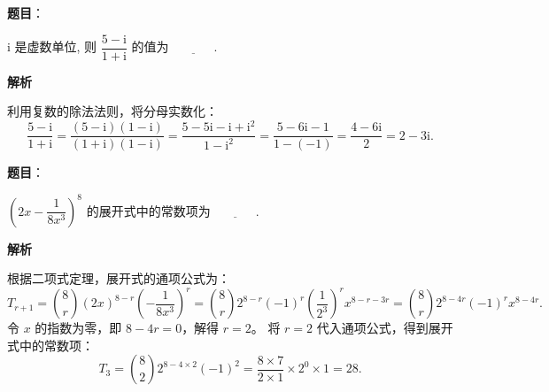 \begin{answer}

\textbf{题目}：

$\mathrm{i}$ 是虚数单位, 则 $\dfrac{5 - \mathrm{i}}{1 + \mathrm{i}}$ 的值为 $\underline{\phantom{XXXX}}$.

\textbf{解析}

利用复数的除法法则，将分母实数化：
\nopagebreak[4]
\[\frac{5 - \mathrm{i}}{1 + \mathrm{i}} = \frac{(5 - \mathrm{i})(1 - \mathrm{i})}{(1 + \mathrm{i})(1 - \mathrm{i})} = \frac{5 - 5\mathrm{i} - \mathrm{i} + \mathrm{i}^2}{1 - \mathrm{i}^2} = \frac{5 - 6\mathrm{i} - 1}{1 - (-1)} = \frac{4 - 6\mathrm{i}}{2} = 2 - 3\mathrm{i}.\]


\end{answer}
\begin{answer}

\textbf{题目}：

$\left(2x - \dfrac{1}{8x^3}\right)^8$ 的展开式中的常数项为 $\underline{\phantom{XXXX}}$.

\textbf{解析}

根据二项式定理，展开式的通项公式为：
\nopagebreak[4]
\[T_{r+1} = \binom{8}{r} (2x)^{8-r} \left(-\frac{1}{8x^3}\right)^r = \binom{8}{r} 2^{8-r} (-1)^r \left(\frac{1}{2^3}\right)^r x^{8-r-3r} = \binom{8}{r} 2^{8-4r} (-1)^r x^{8-4r}.\]
令 $x$ 的指数为零，即 $8 - 4r = 0$，解得 $r = 2$。
将 $r = 2$ 代入通项公式，得到展开式中的常数项：
\nopagebreak[4]
\[T_3 = \binom{8}{2} 2^{8 - 4 \times 2} (-1)^2 = \frac{8 \times 7}{2 \times 1} \times 2^0 \times 1 = 28.\]


\end{answer}

